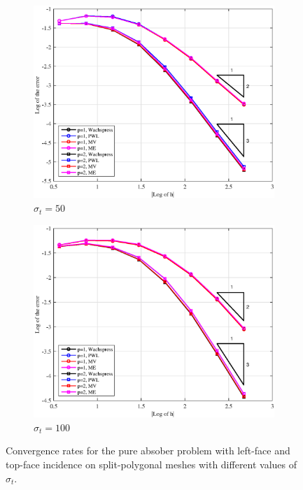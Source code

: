 \begin{figure}
{\begin{subfigure}[b]{0.485\textwidth}
	\end{subfigure}
}
\vspace{1cm}
{
	\begin{subfigure}[b]{0.485\textwidth}
		\centering
		\label{subfig::PA_LeftTop_SplitPoly_sig50}
		\includegraphics[width=\textwidth]{figures/sec_BF/PAErr_LeftTop_SplitPoly_sig50.eps}
	\caption{$\sigma_t = 50$}
	\end{subfigure}
	\hfill
	\begin{subfigure}[b]{0.485\textwidth}
		\centering
		\label{subfig::PA_LeftTop_SplitPoly_sig100}
		\includegraphics[width=\textwidth]{figures/sec_BF/PAErr_LeftTop_SplitPoly_sig100.eps}
	\caption{$\sigma_t = 100$}
	\end{subfigure}
}
\caption{Convergence rates for the pure absober problem with left-face and top-face incidence on split-polygonal meshes with different values of $\sigma_t$.}
\label{fig::BF_Results_PA_LeftTop_SplitPoly}
\end{figure}

